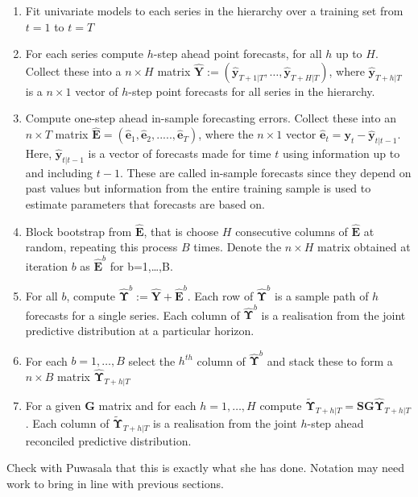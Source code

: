 \documentclass[graybox]{svmult}
\begin{document}
\begin{enumerate}
	\item Fit univariate models to each series in the hierarchy over a training set from $t=1$ to $t=T$
	\item For each series compute $h$-step ahead point forecasts, for all $h$ up to $H$. Collect these into a $n\times H$ matrix $\hat{\bm Y}:=(\hat{\bm{y}}_{T+1|T},\ldots,\hat{\bm{y}}_{T+H|T})$, where $\hat{\bm{y}}_{T+h|T}$ is a $n\times 1$ vector of $h$-step point forecasts for all series in the hierarchy.
	\item Compute one-step ahead in-sample forecasting errors. Collect these into an $n \times T$ matrix ${\hat{\bm E}}=(\hat{\bm{e}}_1,\hat{\bm{e}}_2,.....,\hat{\bm{e}}_T)$, where the $n\times 1$ vector $\hat{\bm{e}}_t={\bm y}_t-\hat{\bm {y}}_{t|t-1}$.  Here, $\hat{\bm {y}}_{t|t-1}$ is a vector of forecasts made for time $t$ using information up to and including $t-1$. These are called in-sample forecasts since they depend on past values but information from the entire training sample is used to estimate parameters that forecasts are based on.
	\item Block bootstrap from $\hat{\bm{E}}$, that is choose $H$ consecutive columns of $\hat{{\bm E}}$ at random, repeating this process $B$ times.  Denote the $n\times H$ matrix obtained at iteration $b$ as $\hat{{\bm E}}^b$ for b=1,\ldots,B.
	\item For all $b$, compute $\hat{\bm \Upsilon}^b:=\hat{\bm Y}+{\bm \hat{\bm{E}}}^b$. Each row of $\hat{\bm \Upsilon}^b$ is a sample path of $h$ forecasts for a single series.  Each column of $\hat{\bm \Upsilon}^b$ is a realisation from the joint predictive distribution at a particular horizon.
	\item For each $b=1,\ldots,B$ select the $h^{th}$ column of $\hat{\bm \Upsilon}^b$ and stack these to form a $n\times B$ matrix $\hat{\bm{\Upsilon}}_{T+h|T}$
	\item For a given ${\bm G}$ matrix and for each $h=1,\ldots,H$ compute $\tilde{\bm{\Upsilon}}_{T+h|T}={\bm S}{\bm G}\hat{\bm{\Upsilon}}_{T+h|T}$.   Each column of $\tilde{\bm \Upsilon}_{T+h|T}$ is a realisation from the joint $h$-step ahead reconciled predictive distribution.
\end{enumerate}


{\color{red}Check with Puwasala that this is exactly what she has done.  Notation may need work to bring in line with previous sections.}

\end{document}
